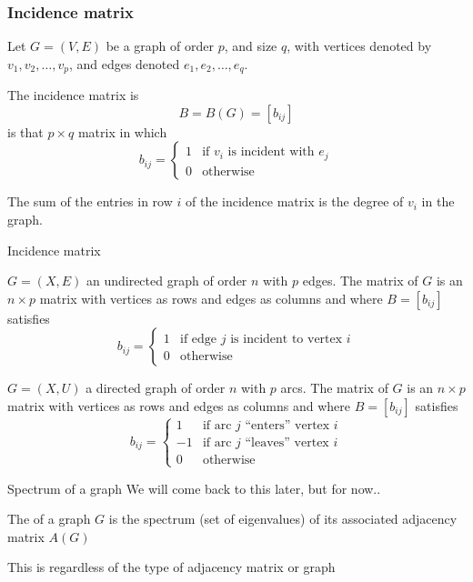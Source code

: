 \documentclass[aspectratio=43]{beamer}
\begin{document}
\begin{frame}\frametitle{Incidence matrix}
	Let $G=(V,E)$ be a graph of order $p$, and size $q$, with vertices denoted by $v_1, v_2, \dots , v_p$, and edges denoted $e_1, e_2, \dots , e_q$.
	\begin{definition}
		The incidence matrix is $$B=B(G)=[b_{ij}]$$ is that $p\times q$ matrix in which
		$$b_{ij}=\left \{ 
		\begin{array}{cc}
			1 & \textrm{if } v_i \textrm{ is incident with } e_j\\
			0 & \textrm{otherwise}
		\end{array}
		\right .
		$$
	\end{definition}
	\begin{theorem}
		The sum of the entries in row $i$ of the incidence matrix is the degree of $v_i$ in the graph.
	\end{theorem}
\end{frame}

\begin{frame}{Incidence matrix}
	\begin{definition}
		$G=(X,E)$ an undirected graph of order $n$ with $p$ edges. The  matrix of $G$ is an $n\times p$ matrix with vertices as rows and edges as columns and where $B=[b_{ij}]$ satisfies
		\[
		b_{ij} = \begin{cases}
			1 & \text{if edge }j\text{ is incident to vertex }i \\
			0 & \text{otherwise}
		\end{cases}
		\]
	\end{definition}
	\vfill
	\begin{definition}
		$G=(X,U)$ a directed graph of order $n$ with $p$ arcs. The  matrix of $G$ is an $n\times p$ matrix with vertices as rows and edges as columns and where $B=[b_{ij}]$ satisfies
		\[
		b_{ij} = \begin{cases}
			1 & \text{if arc }j\text{ ``enters'' vertex }i \\
			-1 & \text{if arc }j\text{ ``leaves'' vertex }i \\
			0 & \text{otherwise}
		\end{cases}
		\]
	\end{definition}
\end{frame}




\begin{frame}{Spectrum of a graph}
	We will come back to this later, but for now..
	\vfill
	\begin{definition}
		The  of a graph $G$ is the spectrum (set of eigenvalues) of its associated adjacency matrix $A(G)$
	\end{definition}
	\vfill
	This is regardless of the type of adjacency matrix or graph
\end{frame}
\end{document}
